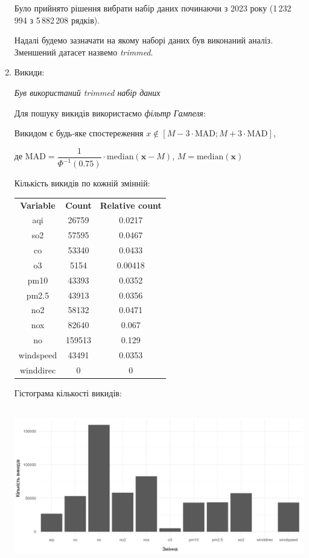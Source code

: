 \documentclass{article}
\begin{document}
\begin{enumerate}
    Було прийнято рішення вибрати набір даних починаючи з 2023 року 
    (1\,232\,994 з 5\,882\,208 рядків).

    Надалі будемо зазначати на якому наборі даних був виконаний аналіз. Зменшений
    датасет назвемо \textit{trimmed}.
    
    \item Викиди:

    \quad \textit{Був використаний trimmed набір даних}
    
    Для пошуку викидів використаємо \textit{фільтр Гампеля}:

    \begin{displayquote}
    Викидом є будь‑яке спостереження 
    $x \notin [M - 3 \cdot \text{MAD}; M + 3 \cdot \text{MAD}]$, 
    
    де $\text{MAD} = \dfrac{1}{\Phi^{-1}(0.75)} \cdot \text{median}(\pmb{x} - M)$,
    $M = \text{median}(\pmb{x})$
    \end{displayquote}

    Кількість викидів по кожній змінній:

    \begin{tabular}{ccc}
    \textbf{Variable} & \textbf{Count} & \textbf{Relative count} \\
    aqi        & 26759  & 0.0217  \\
    so2        & 57595  & 0.0467  \\
    co         & 53340  & 0.0433  \\
    o3         & 5154   & 0.00418 \\
    pm10       & 43393  & 0.0352  \\
    pm2.5      & 43913  & 0.0356  \\
    no2        & 58132  & 0.0471  \\
    nox        & 82640  & 0.067   \\
    no         & 159513 & 0.129   \\
    windspeed  & 43491  & 0.0353 \\
    winddirec  & 0      & 0       \\
    \end{tabular}

   \pagebreak
    
    Гістограма кількості викидів:

    \includegraphics[height=2.7in]{../../plots/outliers/count-bar.png}
    

\end{enumerate}
\end{document}
